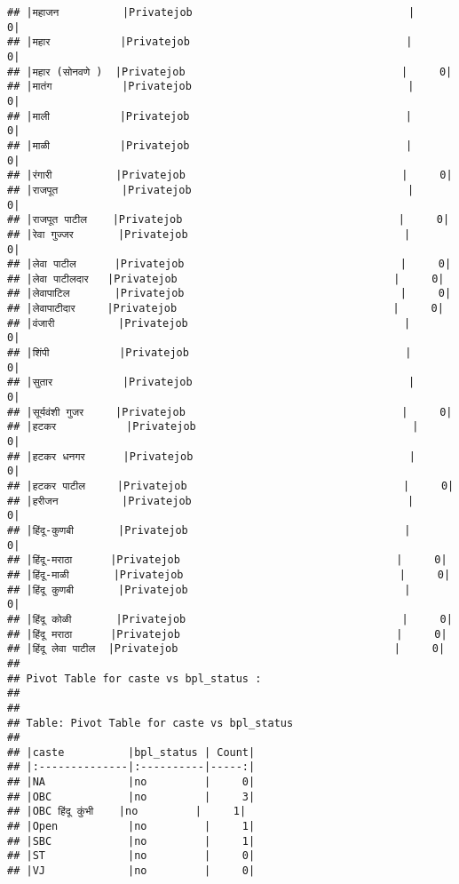 \documentclass[
]{article}
\begin{document}
\begin{verbatim}
## |महाजन          |Privatejob                                  |     0|
## |महार           |Privatejob                                  |     0|
## |महार (सोनवणे )  |Privatejob                                  |     0|
## |मातंग           |Privatejob                                  |     0|
## |माली           |Privatejob                                  |     0|
## |माळी           |Privatejob                                  |     0|
## |रंगारी          |Privatejob                                  |     0|
## |राजपूत          |Privatejob                                  |     0|
## |राजपूत पाटील    |Privatejob                                  |     0|
## |रेवा गुज्जर       |Privatejob                                  |     0|
## |लेवा पाटील      |Privatejob                                  |     0|
## |लेवा पाटीलदार   |Privatejob                                  |     0|
## |लेवापाटिल       |Privatejob                                  |     0|
## |लेवापाटीदार     |Privatejob                                  |     0|
## |वंजारी          |Privatejob                                  |     0|
## |शिंपी           |Privatejob                                  |     0|
## |सुतार           |Privatejob                                  |     0|
## |सूर्यवंशी गुजर     |Privatejob                                  |     0|
## |हटकर           |Privatejob                                  |     0|
## |हटकर धनगर      |Privatejob                                  |     0|
## |हटकर पाटील     |Privatejob                                  |     0|
## |हरीजन          |Privatejob                                  |     0|
## |हिंदू-कुणबी       |Privatejob                                  |     0|
## |हिंदू-मराठा      |Privatejob                                  |     0|
## |हिंदू-माळी       |Privatejob                                  |     0|
## |हिंदू कुणबी       |Privatejob                                  |     0|
## |हिंदू कोळी       |Privatejob                                  |     0|
## |हिंदू मराठा      |Privatejob                                  |     0|
## |हिंदू लेवा पाटील  |Privatejob                                  |     0|
## 
## Pivot Table for caste vs bpl_status :
## 
## 
## Table: Pivot Table for caste vs bpl_status
## 
## |caste          |bpl_status | Count|
## |:--------------|:----------|-----:|
## |NA             |no         |     0|
## |OBC            |no         |     3|
## |OBC हिंदू कुंभी    |no         |     1|
## |Open           |no         |     1|
## |SBC            |no         |     1|
## |ST             |no         |     0|
## |VJ             |no         |     0|

\end{verbatim}
\end{document}
